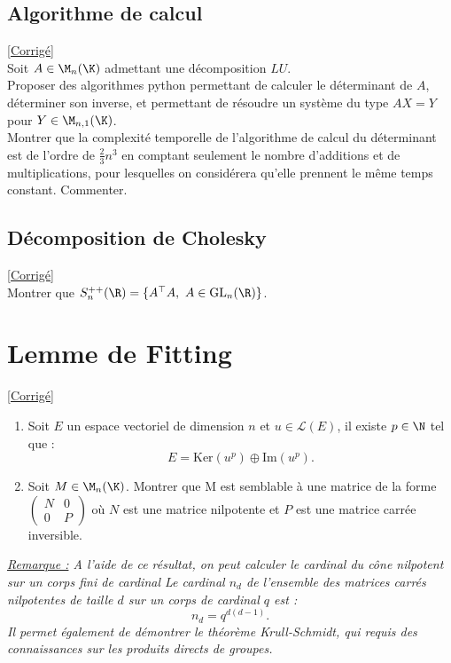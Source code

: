 \documentclass[8pt]{book}
\begin{document}
\subsection{Algorithme de calcul }
\label{Algorithme de calcul}
\textcolor{blue}{\hyperref[Algorithme de calcul corrigé]{[Corrigé]}}\\
Soit $A\in \M_n(\K)$ admettant une décomposition $LU$.\\
Proposer des algorithmes python permettant de calculer le déterminant de $A$, déterminer son inverse, et permettant de résoudre un système du type $AX=Y$ pour $Y\in \M_{n,1}(\K)$.\\
Montrer que la complexité temporelle de l'algorithme de calcul du déterminant est de l'ordre de $\displaystyle\frac{2}{3}n^3$ en comptant seulement le nombre d'additions et de multiplications, pour lesquelles on considérera qu'elle prennent le même temps constant. Commenter.

\subsection{Décomposition de Cholesky}
\label{Décomposition de Cholesky}
\textcolor{blue}{\hyperref[Décomposition de Cholesky corrigé]{[Corrigé]}}\\
Montrer que $S_n^{++}(\R)=\{A^\top A,\ A\in \text{GL}_n(\R)\}$.

\section{Lemme de Fitting}
\label{Lemme de Fitting}
\textcolor{blue}{\hyperref[Lemme de Fitting corrigé]{[Corrigé]}}\\
\begin{enumerate}
	\item Soit $E$ un espace vectoriel de dimension $n$ et $u\in\mathcal{L}(E)$, il existe $p\in\N$ tel que : $$E=\text{Ker}(u^p)\oplus\text{Im}(u^p). $$
	\item Soit $M\in\M_n(\K)$. Montrer que M est semblable à une matrice de la forme $\begin{pmatrix}
		N&0\\0&P
	\end{pmatrix}$ où $N$ est une matrice nilpotente et $P$ est une matrice carrée inversible.
\end{enumerate}
\textit{\underline{Remarque :} A l'aide de ce résultat, on peut calculer le cardinal du cône nilpotent sur un corps fini de cardinal 
	Le cardinal $n_d$ de l'ensemble des matrices carrés nilpotentes de taille $d$ sur un corps de cardinal $q$ est :$$n_d=q^{d(d-1)}.$$ Il permet également de démontrer le théorème Krull-Schmidt, qui requis des connaissances sur les produits directs de groupes.}
\end{document}
